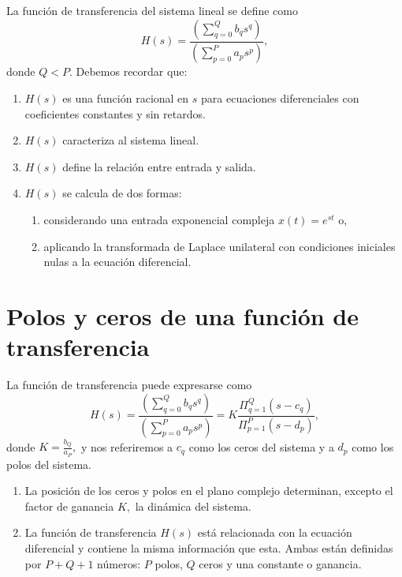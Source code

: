 La funci\'{o}n de transferencia del sistema lineal se define como
\begin{equation}
	H\left( s\right) =
	\frac{\left( \sum_{q=0}^{Q}b_{q}s^{q}\right) }{\left(\sum_{p=0}^{P}a_{p}s^{p}\right) },
\end{equation}
donde $Q < P$. Debemos recordar que:
\begin{enumerate}
	\item $H(s)$ es una funci\'{o}n racional en $s$ para ecuaciones diferenciales con coeficientes constantes y sin retardos.
	\item $H(s)$ caracteriza al sistema lineal.
	\item $H(s)$ define la relaci\'{o}n entre entrada y salida.
	\item $H(s)$ se calcula de dos formas:
	\begin{enumerate}
		\item considerando una entrada exponencial compleja $x(t) = e^{s t}$ o,
		\item aplicando la transformada de Laplace unilateral con condiciones iniciales nulas a la ecuaci\'{o}n diferencial.
	\end{enumerate}
\end{enumerate}

\section{Polos y ceros de una funci\'{o}n de transferencia}

La funci\'{o}n de transferencia puede expresarse como 
\begin{equation}
	H\left( s\right) =
	\frac{\left( \sum_{q=0}^{Q}b_{q}s^{q}\right) }{\left(\sum_{p=0}^{P}a_{p}s^{p}\right) }=
	K\frac{\Pi _{q=1}^{Q}\left(s-c_{q}\right) }{\Pi _{p=1}^{P}\left( s-d_{p}\right) },
\end{equation}
donde $K=\frac{b_{Q}}{a_{P}},$ y nos referiremos a $c_{q}$ como los ceros del sistema y a $d_{p}$ como los polos del sistema.

\begin{enumerate}
	\item La posici\'{o}n de los ceros y polos en el plano complejo determinan, excepto el factor de ganancia $K,$ la din\'{a}mica del sistema.
	\item La funci\'{o}n de transferencia $H\left( s\right) $ est\'{a} relacionada con la ecuaci\'{o}n diferencial y contiene la misma informaci\'{o}n que esta. Ambas est\'{a}n definidas por $P+Q+1$ n\'{u}meros: $P$ polos, $Q$ ceros y una constante o ganancia.
\end{enumerate}

